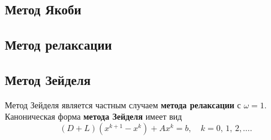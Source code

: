 \documentclass[12pt, a4paper]{article}
\begin{document}
	\subsection{Метод Якоби}
			
	\subsection{Метод релаксации}	

	\subsection{Метод Зейделя}
Метод Зейделя является частным случаем \textbf{метода релаксации} с $\omega = 1$. Каноническая форма \textbf{метода Зейделя} имеет вид
$$
\left( D + L \right ) \left( x^{k+1} - x^k \right ) + Ax^k = b, \quad k = 0, \, 1, \, 2, \dots.
$$
	
\end{document}
